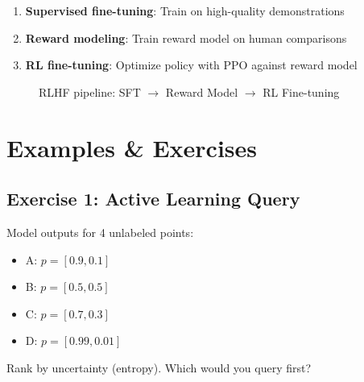 
\begin{enumerate}
    \item \textbf{Supervised fine-tuning}: Train on high-quality demonstrations
    \item \textbf{Reward modeling}: Train reward model on human comparisons
    \item \textbf{RL fine-tuning}: Optimize policy with PPO against reward model
\end{enumerate}

\begin{figure}[h]
\centering
{}
\caption{RLHF pipeline: SFT $\to$ Reward Model $\to$ RL Fine-tuning}
\end{figure}



\section{Examples \& Exercises}

\subsection{Exercise 1: Active Learning Query}

Model outputs for 4 unlabeled points:
\begin{itemize}
    \item A: $p = [0.9, 0.1]$
    \item B: $p = [0.5, 0.5]$
    \item C: $p = [0.7, 0.3]$
    \item D: $p = [0.99, 0.01]$
\end{itemize}

Rank by uncertainty (entropy). Which would you query first?

